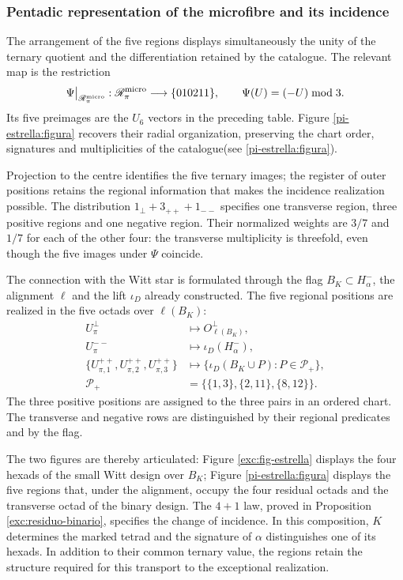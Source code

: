 \subsubsection{Pentadic representation of the microfibre and its incidence}
\label{pi-estrella:desarrollo}

The arrangement of the five regions displays simultaneously
the unity of the ternary quotient and the differentiation retained by the
catalogue. The relevant map is the restriction
\[
 \Psi\big|_{\mathscr R_\pi^{\rm micro}}:
 \mathscr R_\pi^{\rm micro}\longrightarrow\{010211\},
 \qquad \Psi(U)=(-U)\bmod3.
\]
Its five preimages are the \(U_6\) vectors in the preceding table.
Figure \ref{pi-estrella:figura} recovers their radial organization,
preserving the chart order, signatures and multiplicities of the
catalogue(see \ref{pi-estrella:figura}).



Projection to the centre identifies the five ternary images; the
register of outer positions retains the regional information
that makes the incidence realization possible. The distribution
\(1_\perp+3_{++}+1_{--}\) specifies one transverse region, three
positive regions and one negative region. Their normalized weights are
\(3/7\) and \(1/7\) for each of the other four: the
transverse multiplicity is threefold, even though the five images under
\(\Psi\) coincide.

The connection with the Witt star is formulated through the flag
\(B_K\subset H^-_\alpha\), the alignment \(\ell\) and the
lift \(\iota_D\) already constructed. The five regional positions
are realized in the five octads over \(\ell(B_K)\):
\[
\begin{aligned}
 U_\pi^\perp&\longmapsto O^\perp_{\ell(B_K)},\\
 U_\pi^{--}&\longmapsto\iota_D(H^-_\alpha),\\
 \{U_{\pi,1}^{++},U_{\pi,2}^{++},U_{\pi,3}^{++}\}
 &\longmapsto
 \{\iota_D(B_K\cup P):P\in\mathcal P_+\},\\
 \mathcal P_+&=\bigl\{\{1,3\},\{2,11\},\{8,12\}\bigr\}.
\end{aligned}
\]
The three positive positions are assigned to the three pairs
in an ordered chart. The transverse and negative rows
are distinguished by their regional predicates and by the flag.

The two figures are thereby articulated: Figure
\ref{exc:fig-estrella} displays the four hexads of the small Witt
design over \(B_K\); Figure \ref{pi-estrella:figura} displays
the five regions that, under the alignment, occupy the four residual
octads and the transverse octad of the binary design. The
\(4+1\) law, proved in Proposition
\ref{exc:residuo-binario}, specifies the change of incidence. In this
composition, \(K\) determines the marked tetrad and the signature of
\(\alpha\) distinguishes one of its hexads. In addition to their
common ternary value, the regions retain the structure required for this
transport to the exceptional realization.
